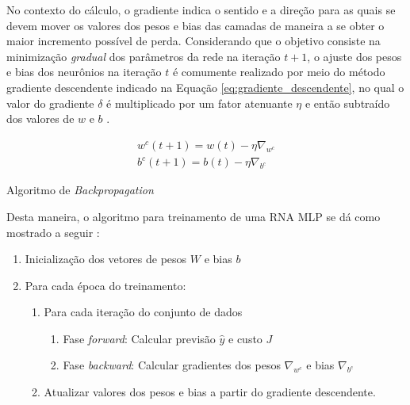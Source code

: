 No contexto do cálculo, o gradiente indica o sentido e a direção para as quais se devem mover os valores dos pesos e bias das camadas de maneira a se obter o maior incremento possível de perda. Considerando que o objetivo consiste na minimização \emph{gradual} dos parâmetros da rede na iteração $t+1$, o ajuste dos pesos e bias dos neurônios na iteração $t$ é comumente realizado por meio do método gradiente descendente indicado na Equação \ref{eq:gradiente_descendente}, no qual o valor do gradiente $\delta$ é multiplicado por um fator atenuante $\eta$ e então subtraído dos valores de $w$ e $b$ \cite{haykin2009neural, goodfellow2016deep}.

\begin{gather}\label{eq:gradiente_descendente}
	w^c(t+1) = w(t) - \eta \nabla_{w^c} \\
	b^c(t+1) = b(t) - \eta \nabla_{b^c}
\end{gather}

\begin{algorithm}\label{alg:backpropagation}
	\caption{Algoritmo de \emph{Backpropagation}}
\end{algorithm}

Desta maneira, o algoritmo para treinamento de uma RNA MLP se dá como mostrado a seguir \cite{Teresa:Livro}:

\begin{enumerate}
	\item Inicialização dos vetores de pesos $W$ e bias $b$
	\item Para cada época do treinamento:
	\begin{enumerate}
		\item Para cada iteração do conjunto de dados
		\begin{enumerate}
			\item Fase \emph{forward}: Calcular previsão $\hat{y}$ e custo $J$
			\item Fase \emph{backward}:
				Calcular gradientes dos pesos $\nabla_{w^c}$ e bias $\nabla_{b^c}$
		\end{enumerate}
		\item Atualizar valores dos pesos e bias a partir do gradiente descendente.
	\end{enumerate}
\end{enumerate}


